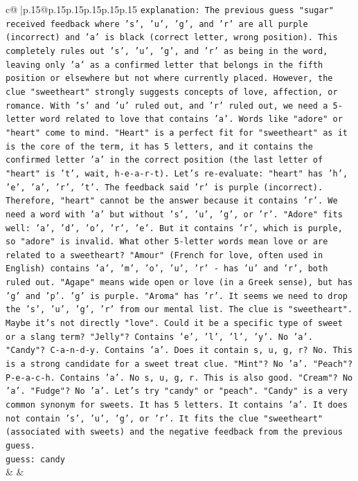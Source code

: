 \documentclass{article}
\begin{document}
{\begin{supertabular}{c@{$\;$}|p{.15\linewidth}@{}p{.15\linewidth}p{.15\linewidth}p{.15\linewidth}p{.15\linewidth}p{.15\linewidth}}
{{{                \texttt{explanation: The previous guess "sugar" received feedback where 's', 'u', 'g', and 'r' are all purple (incorrect) and 'a' is black (correct letter, wrong position). This completely rules out 's', 'u', 'g', and 'r' as being in the word, leaving only 'a' as a confirmed letter that belongs in the fifth position or elsewhere but not where currently placed. However, the clue "sweetheart" strongly suggests concepts of love, affection, or romance. With 's' and 'u' ruled out, and 'r' ruled out, we need a 5{-}letter word related to love that contains 'a'. Words like "adore" or "heart" come to mind. "Heart" is a perfect fit for "sweetheart" as it is the core of the term, it has 5 letters, and it contains the confirmed letter 'a' in the correct position (the last letter of "heart" is 't', wait, h{-}e{-}a{-}r{-}t). Let's re{-}evaluate: "heart" has 'h', 'e', 'a', 'r', 't'. The feedback said 'r' is purple (incorrect). Therefore, "heart" cannot be the answer because it contains 'r'. We need a word with 'a' but without 's', 'u', 'g', or 'r'. "Adore" fits well: 'a', 'd', 'o', 'r', 'e'. But it contains 'r', which is purple, so "adore" is invalid. What other 5{-}letter words mean love or are related to a sweetheart? "Amour" (French for love, often used in English) contains 'a', 'm', 'o', 'u', 'r' {-} has 'u' and 'r', both ruled out. "Agape" means wide open or love (in a Greek sense), but has 'g' and 'p'. 'g' is purple. "Aroma" has 'r'. It seems we need to drop the 's', 'u', 'g', 'r' from our mental list. The clue is "sweetheart". Maybe it's not directly "love". Could it be a specific type of sweet or a slang term? "Jelly"? Contains 'e', 'l', 'l', 'y'. No 'a'. "Candy"? C{-}a{-}n{-}d{-}y. Contains 'a'. Does it contain s, u, g, r? No. This is a strong candidate for a sweet treat clue. "Mint"? No 'a'. "Peach"? P{-}e{-}a{-}c{-}h. Contains 'a'. No s, u, g, r. This is also good. "Cream"? No 'a'. "Fudge"? No 'a'. Let's try "candy" or "peach". "Candy" is a very common synonym for sweets. It has 5 letters. It contains 'a'. It does not contain 's', 'u', 'g', or 'r'. It fits the clue "sweetheart" (associated with sweets) and the negative feedback from the previous guess.} \\
\texttt{guess: candy} \\
            }
        }
    }
    & & \\ \\


\end{supertabular}}
\end{document}
